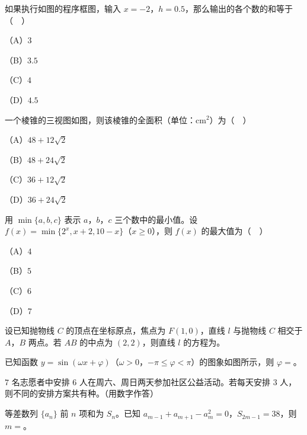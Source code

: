 \begin{question}
如果执行如图的程序框图，输入 $x=-2$，$h=0.5$，那么输出的各个数的和等于（　）
\nopagebreak[4]
\begin{center}\end{center}
\nopagebreak[4]
（A）$3$

（B）$3.5$

（C）$4$

（D）$4.5$

\Needspace{0.4\textheight}
\end{question}
\begin{question}
一个棱锥的三视图如图，则该棱锥的全面积（单位：$\mathrm{cm}^2$）为（　）
\nopagebreak[4]
\begin{center}\end{center}
\nopagebreak[4]
（A）$48+12\sqrt2$

（B）$48+24\sqrt2$

（C）$36+12\sqrt2$

（D）$36+24\sqrt2$

\end{question}
\begin{question}
用 $\min\{a,b,c\}$ 表示 $a$，$b$，$c$ 三个数中的最小值。设 $f(x)=\min\{2^x,x+2,10-x\}$（$x\geqslant0$），则 $f(x)$ 的最大值为（　）

（A）$4$

（B）$5$

（C）$6$

（D）$7$

\end{question}

\begin{question}
设已知抛物线 $C$ 的顶点在坐标原点，焦点为 $F(1,0)$，直线 $l$ 与抛物线 $C$ 相交于 $A$，$B$ 两点。若 $AB$ 的中点为 $(2,2)$，则直线 $l$ 的方程为\gkblank{}。

\Needspace{0.4\textheight}
\end{question}
\begin{question}
已知函数 $y=\sin(\omega x+\varphi)$（$\omega>0$，$-\pi\leqslant\varphi<\pi$）的图象如图所示，则 $\varphi=$\gkblank{}。
\nopagebreak[4]
\begin{center}\end{center}
\nopagebreak[4]
\end{question}
\begin{question}
$7$ 名志愿者中安排 $6$ 人在周六、周日两天参加社区公益活动。若每天安排 $3$ 人，则不同的安排方案共有\gkblank{}种。（用数字作答）

\end{question}
\begin{question}
等差数列 $\{a_n\}$ 前 $n$ 项和为 $S_n$。已知 $a_{m-1}+a_{m+1}-a_m^2=0$，$S_{2m-1}=38$，则 $m=$\gkblank{}。

\end{question}

